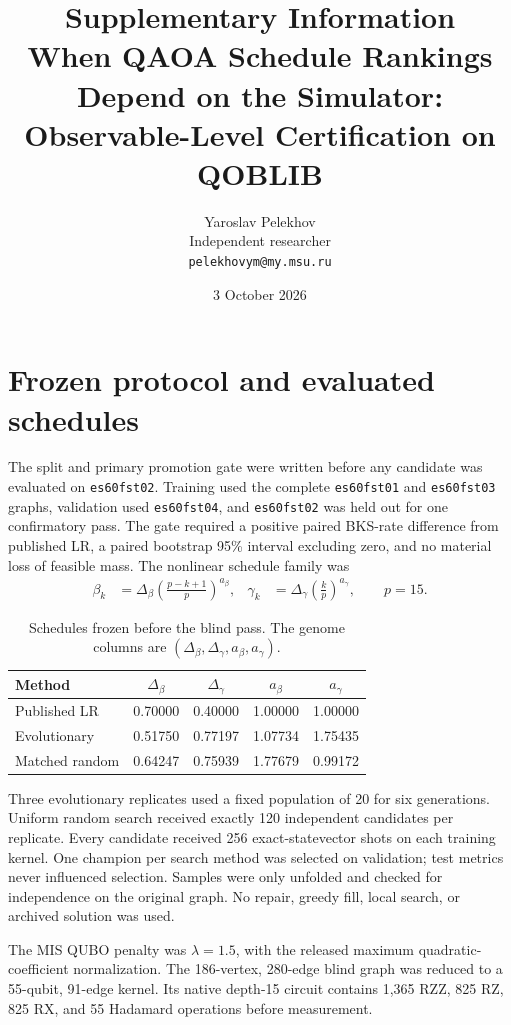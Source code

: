 \documentclass[10pt]{article}
\title{Supplementary Information\\[2mm]
\large When QAOA Schedule Rankings Depend on the Simulator:
Observable-Level Certification on QOBLIB}
\author{Yaroslav Pelekhov\\\small Independent researcher\\\small \texttt{pelekhovym@my.msu.ru}}
\date{3 October 2026}
\begin{document}
\maketitle

\section{Frozen protocol and evaluated schedules}

The split and primary promotion gate were written before any candidate was
evaluated on \texttt{es60fst02}. Training used the complete
\texttt{es60fst01} and \texttt{es60fst03} graphs, validation used
\texttt{es60fst04}, and \texttt{es60fst02} was held out for one confirmatory
pass. The gate required a positive paired BKS-rate difference from published
LR, a paired bootstrap 95\% interval excluding zero, and no material loss of
feasible mass. The nonlinear schedule family was
\begin{align*}
 \beta_k &= \Delta_\beta\left(\frac{p-k+1}{p}\right)^{a_\beta}, &
 \gamma_k &= \Delta_\gamma\left(\frac{k}{p}\right)^{a_\gamma},
 \qquad p=15.
\end{align*}

\begin{table}[h]
\centering
\caption{Schedules frozen before the blind pass. The genome columns are
$(\Delta_\beta,\Delta_\gamma,a_\beta,a_\gamma)$.}
\begin{tabular}{lcccc}
\toprule
Method & $\Delta_\beta$ & $\Delta_\gamma$ & $a_\beta$ & $a_\gamma$ \\
\midrule
Published LR & 0.70000 & 0.40000 & 1.00000 & 1.00000 \\
Evolutionary & 0.51750 & 0.77197 & 1.07734 & 1.75435 \\
Matched random & 0.64247 & 0.75939 & 1.77679 & 0.99172 \\
\bottomrule
\end{tabular}
\end{table}

Three evolutionary replicates used a fixed population of 20 for six
generations. Uniform random search received exactly 120 independent candidates
per replicate. Every candidate received 256 exact-statevector shots on each
training kernel. One champion per search method was selected on validation;
test metrics never influenced selection. Samples were only unfolded and
checked for independence on the original graph. No repair, greedy fill, local
search, or archived solution was used.

The MIS QUBO penalty was $\lambda=1.5$, with the released maximum
quadratic-coefficient normalization. The 186-vertex, 280-edge blind graph was
reduced to a 55-qubit, 91-edge kernel. Its native depth-15 circuit contains
1,365 RZZ, 825 RZ, 825 RX, and 55 Hadamard operations before measurement.
\end{document}
